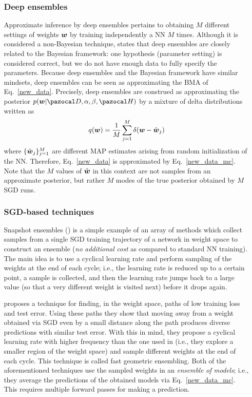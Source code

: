 \subsubsection{Deep ensembles}\label{sec:deep_ensembles}
Approximate inference by deep ensembles pertains to obtaining $M$ different settings of weights $\boldsymbol{w}$ by training independently a NN $M$ times. 
Although it is considered a non-Bayesian technique, \textcite{wilson2020bayesian} states that deep ensembles are closely related to the Bayesian framework: one hypothesis (parameter setting) is considered correct, but we do not have enough data to fully specify the parameters. 
Because deep ensembles and the Bayesian framework have similar mindsets, deep ensembles can be seen as approximating the BMA of Eq.~\eqref{new_data}. 
Precisely, deep ensembles are construed as approximating the posterior $p(\bw|\cD,\alpha,\beta,\cH)$ by a mixture of delta distributions written as
\begin{equation}\label{deep_ensembles_posterior}
q(\boldsymbol{w}) = \frac{1}{M}\sum_{j=1}^{M}\delta(\boldsymbol{w}-\hat{\boldsymbol{w}}_j)
\end{equation}
where $\{\hat{\boldsymbol{w}}_j\}_{j=1}^M$ are different MAP estimates arising from random initialization of the NN.
Therefore, Eq.~\eqref{new_data} is approximated by Eq.~\eqref{new_data_mc}.
Note that the $M$ values of $\hat{\boldsymbol{w}}$ in this context are not samples from an approximate posterior, but rather $M$ modes of the true posterior obtained by $M$ SGD runs.

\subsubsection{SGD-based techniques}\label{sec:sgd}
Snapshot ensembles (\cite{huang2017snapshot}) is a simple example of an array of methods which collect samples from a single SGD training trajectory of a network in weight space to construct an ensemble (\textit{no additional cost} as compared to standard NN training).
The main idea is to use a cyclical learning rate and perform sampling of the weights at the end of each cycle; i.e., the learning rate is reduced up to a certain point, a sample is collected, and then the learning rate jumps back to a large value (so that a very different weight is visited next) before it drops again. 

\textcite{garipov2018loss} proposes a technique for finding, in the weight space, paths of low training loss and test error. 
Using these paths they show that moving away from a weight obtained via SGD even by a small distance along the path produces diverse predictions with similar test error. 
With this in mind, they propose a cyclical learning rate with higher frequency than the one used in \textcite{huang2017snapshot} (i.e., they explore a smaller region of the weight space) and sample different weights at the end of each cycle. 
This technique is called fast geometric ensembling. 
Both of the aforementioned techniques use the sampled weights in an \textit{ensemble of models}; i.e., they average the predictions of the obtained models via Eq.~\eqref{new_data_mc}.
This requires multiple forward passes for making a prediction. 

